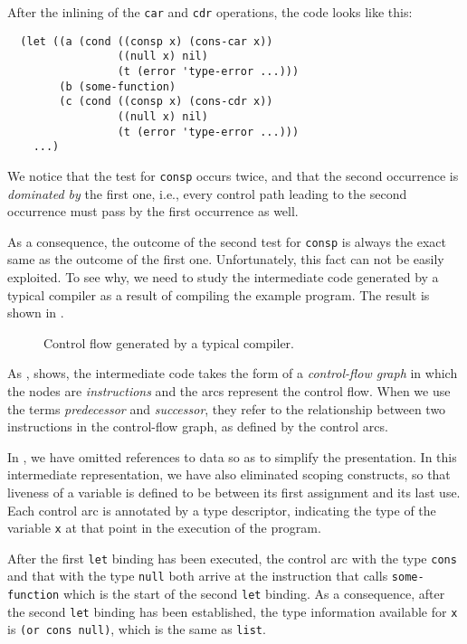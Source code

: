 After the inlining of the \texttt{car} and \texttt{cdr} operations,
the code looks like this:

\begin{verbatim}
  (let ((a (cond ((consp x) (cons-car x))
                 ((null x) nil)
                 (t (error 'type-error ...)))
        (b (some-function)
        (c (cond ((consp x) (cons-cdr x))
                 ((null x) nil)
                 (t (error 'type-error ...)))
    ...)
\end{verbatim}

We notice that the test for \texttt{consp} occurs twice, and that the
second occurrence is \emph{dominated by} the first one, i.e., every
control path leading to the second occurrence must pass by the first
occurrence as well.

As a consequence, the outcome of the second test for \texttt{consp} is
always the exact same as the outcome of the first one.
Unfortunately, this fact can not be easily exploited.  To see why, we
need to study the intermediate code generated by a typical compiler as
a result of compiling the example program.  The result is shown in
.

\begin{figure}
\begin{center}
\end{center}
\caption{\label{fig-example-naive}
Control flow generated by a typical compiler.}
\end{figure}

As , shows, the intermediate code takes the
form of a \emph{control-flow graph} in which the nodes are
\emph{instructions} and the arcs represent the control flow.  When we
use the terms \emph{predecessor} and \emph{successor}, they refer to
the relationship between two instructions in the control-flow graph,
as defined by the control arcs.

In , we have omitted references to data so
as to simplify the presentation.  In this intermediate representation,
we have also eliminated scoping constructs, so that liveness of a
variable is defined to be between its first assignment and its last
use.  Each control arc is annotated by a type descriptor, indicating
the type of the variable \texttt{x} at that point in the execution of
the program.

After the first \texttt{let} binding has been executed, the control
arc with the type \texttt{cons} and that with the type \texttt{null}
both arrive at the instruction that calls \texttt{some-function} which
is the start of the second \texttt{let} binding.  As a consequence,
after the second \texttt{let} binding has been established, the type
information available for \texttt{x} is \texttt{(or cons null)}, which
is the same as \texttt{list}.

